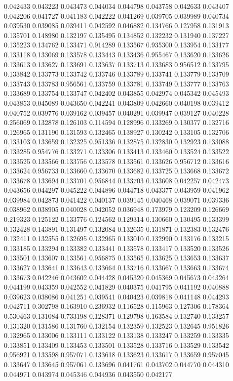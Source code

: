 0.042433
0.043223
0.043473
0.044034
0.044798
0.043758
0.042633
0.043407
0.042206
0.041727
0.041183
0.042222
0.041269
0.039705
0.039989
0.040734
0.039530
0.039085
0.039411
0.042592
0.046882
0.134766
0.127958
0.131913
0.135701
0.148980
0.132197
0.135495
0.134852
0.132232
0.131940
0.137227
0.135223
0.134762
0.133471
0.914289
0.133567
0.935300
0.133954
0.133177
0.133118
0.133069
0.133578
0.133443
0.133436
0.955467
0.133620
0.133626
0.133613
0.133627
0.133691
0.133637
0.133713
0.133683
0.956512
0.133795
0.133842
0.133773
0.133742
0.133746
0.133789
0.133741
0.133779
0.133709
0.133743
0.133783
0.956561
0.133759
0.133781
0.133749
0.133777
0.133763
0.133689
0.133754
0.133747
0.042402
0.043855
0.042974
0.045342
0.045493
0.043853
0.045089
0.043650
0.042241
0.043809
0.042660
0.040198
0.039412
0.040752
0.039776
0.039162
0.039457
0.040291
0.039947
0.039127
0.040228
0.256069
0.132878
0.126103
0.114594
0.128996
0.133269
0.130377
0.132716
0.126965
0.131190
0.131593
0.132465
0.138927
0.130242
0.133105
0.132706
0.133103
0.133659
0.132325
0.951336
0.132875
0.132830
0.132923
0.133088
0.133285
0.954776
0.133271
0.133306
0.133413
0.133460
0.133524
0.133522
0.133525
0.133566
0.133756
0.133578
0.133561
0.133626
0.956712
0.133616
0.133624
0.956733
0.133660
0.133670
0.133682
0.133725
0.133668
0.133672
0.133678
0.133694
0.133701
0.956844
0.133703
0.133608
0.042257
0.042473
0.043656
0.044297
0.045222
0.044896
0.044718
0.043377
0.043959
0.041962
0.039984
0.042873
0.041422
0.040137
0.039145
0.040468
0.039071
0.039336
0.038962
0.038905
0.040028
0.042052
0.036948
0.173979
0.123209
0.126669
0.219323
0.125122
0.133776
0.124562
0.129314
0.130660
0.130495
0.133399
0.132428
0.143891
0.131497
0.132084
0.132635
0.131871
0.132383
0.132476
0.132411
0.132555
0.132695
0.132965
0.133010
0.132990
0.133176
0.133215
0.133185
0.133294
0.133382
0.133441
0.133578
0.133417
0.133520
0.133526
0.133501
0.133607
0.133561
0.956875
0.133565
0.133625
0.133653
0.133637
0.133627
0.133641
0.133643
0.133664
0.133716
0.133667
0.133663
0.133674
0.133673
0.042246
0.043602
0.044428
0.045320
0.045369
0.045673
0.043264
0.044199
0.043359
0.042552
0.041829
0.040375
0.041795
0.041192
0.040888
0.039623
0.038086
0.041251
0.039541
0.040423
0.039818
0.041148
0.044293
0.042711
0.302798
0.163910
0.236932
0.116528
0.115963
0.127306
0.178364
0.530463
0.131084
0.733198
0.128371
0.129798
0.163584
0.132740
0.133257
0.131320
0.131586
0.131760
0.132154
0.132359
0.132523
0.132645
0.951826
0.132965
0.133006
0.133111
0.133122
0.133138
0.133247
0.133259
0.133335
0.133851
0.133409
0.133453
0.133501
0.133528
0.133716
0.133529
0.133542
0.956921
0.133598
0.957071
0.133618
0.133623
0.133617
0.133659
0.957045
0.133647
0.133645
0.957061
0.133696
0.041761
0.043702
0.044770
0.044310
0.044971
0.043974
0.045346
0.044936
0.043550
0.042177
